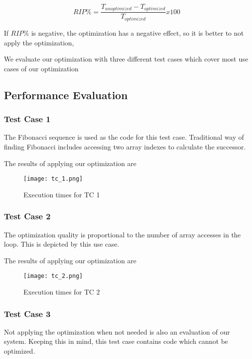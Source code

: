 \begin{equation*}
RIP \% = \frac{T_{unoptimized}-T_{optimized}}{T_{optimized}} x 100%
\end{equation*}

If  $RIP\%$ is negative,  the  optimization has a negative effect, so it is better to not apply the optimization,

We evaluate our optimization with three different test cases which cover most use cases of our optimization

\subsection{Performance Evaluation}

\subsubsection{Test Case 1}

The Fibonacci sequence is used as the code for this test case. Traditional way of finding Fibonacci includes accessing two array indexes to calculate the successor. 

The results of applying our optimization are

\begin{figure}[H]
	\texttt{[image: tc\_1.png]}
	\caption{Execution times for TC 1}
	\label{TC_1}	
\end{figure}

\subsubsection{Test Case 2}

The optimization quality is proportional to the number of array accesses in the loop. This is depicted by this use case. 

The results of applying our optimization are

\begin{figure}[H]
	\centering
	\texttt{[image: tc\_2.png]}
	\caption{Execution times for TC 2}
	\label{TC_2}	
\end{figure}

\subsubsection{Test Case 3}

Not applying the optimization when not needed is also an evaluation of our system. Keeping this in mind, this test case contains code which cannot be optimized.

